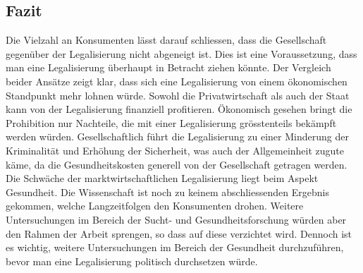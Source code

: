 \documentclass[../main.tex]{subfiles}
\begin{document}
	
	\subsection{Fazit}
	Die Vielzahl an Konsumenten lässt darauf schliessen, dass die Gesellschaft gegenüber der Legalisierung nicht abgeneigt ist.
	Dies ist eine Voraussetzung, dass man eine Legalisierung überhaupt in Betracht ziehen könnte.
	Der Vergleich beider Ansätze zeigt klar, dass sich eine Legalisierung von einem ökonomischen Standpunkt mehr lohnen würde.
	Sowohl die Privatwirtschaft als auch der Staat kann von der Legalisierung finanziell profitieren.
	Ökonomisch gesehen bringt die Prohibition nur Nachteile, die mit einer Legalisierung grösstenteils bekämpft werden würden.
	Gesellschaftlich führt die Legalisierung zu einer Minderung der Kriminalität und Erhöhung der Sicherheit, was auch der Allgemeinheit zugute käme, da die Gesundheitskosten generell von der Gesellschaft getragen werden.\\
	
	\noindent		
	Die Schwäche der marktwirtschaftlichen Legalisierung liegt beim Aspekt Gesundheit.
	Die Wissenschaft ist noch zu keinem abschliessenden Ergebnis gekommen, welche Langzeitfolgen den Konsumenten drohen.
	Weitere Untersuchungen im Bereich der Sucht- und Gesundheitsforschung würden aber den Rahmen der Arbeit sprengen, so dass auf diese verzichtet wird.
	Dennoch ist es wichtig, weitere Untersuchungen im Bereich der Gesundheit durchzuführen, bevor man eine Legalisierung politisch durchsetzen würde.
	

	
\end{document}
